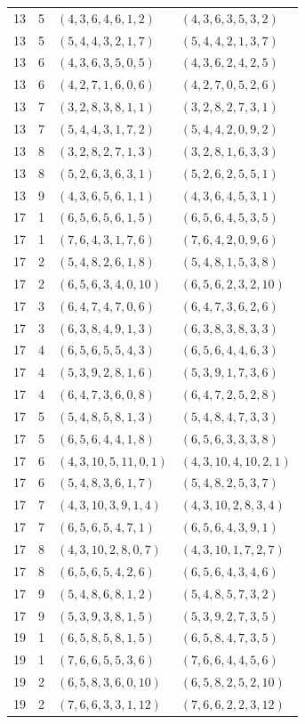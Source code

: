 \begin{longtable}{rrll}
13&5&$(4,3,6,4,6,1,2)$&$(4,3,6,3,5,3,2)$\\
13&5&$(5,4,4,3,2,1,7)$&$(5,4,4,2,1,3,7)$\\
13&6&$(4,3,6,3,5,0,5)$&$(4,3,6,2,4,2,5)$\\
13&6&$(4,2,7,1,6,0,6)$&$(4,2,7,0,5,2,6)$\\
13&7&$(3,2,8,3,8,1,1)$&$(3,2,8,2,7,3,1)$\\
13&7&$(5,4,4,3,1,7,2)$&$(5,4,4,2,0,9,2)$\\
13&8&$(3,2,8,2,7,1,3)$&$(3,2,8,1,6,3,3)$\\
13&8&$(5,2,6,3,6,3,1)$&$(5,2,6,2,5,5,1)$\\
13&9&$(4,3,6,5,6,1,1)$&$(4,3,6,4,5,3,1)$\\
17&1&$(6,5,6,5,6,1,5)$&$(6,5,6,4,5,3,5)$\\
17&1&$(7,6,4,3,1,7,6)$&$(7,6,4,2,0,9,6)$\\
17&2&$(5,4,8,2,6,1,8)$&$(5,4,8,1,5,3,8)$\\
17&2&$(6,5,6,3,4,0,10)$&$(6,5,6,2,3,2,10)$\\
17&3&$(6,4,7,4,7,0,6)$&$(6,4,7,3,6,2,6)$\\
17&3&$(6,3,8,4,9,1,3)$&$(6,3,8,3,8,3,3)$\\
17&4&$(6,5,6,5,5,4,3)$&$(6,5,6,4,4,6,3)$\\
17&4&$(5,3,9,2,8,1,6)$&$(5,3,9,1,7,3,6)$\\
17&4&$(6,4,7,3,6,0,8)$&$(6,4,7,2,5,2,8)$\\
17&5&$(5,4,8,5,8,1,3)$&$(5,4,8,4,7,3,3)$\\
17&5&$(6,5,6,4,4,1,8)$&$(6,5,6,3,3,3,8)$\\
17&6&$(4,3,10,5,11,0,1)$&$(4,3,10,4,10,2,1)$\\
17&6&$(5,4,8,3,6,1,7)$&$(5,4,8,2,5,3,7)$\\
17&7&$(4,3,10,3,9,1,4)$&$(4,3,10,2,8,3,4)$\\
17&7&$(6,5,6,5,4,7,1)$&$(6,5,6,4,3,9,1)$\\
17&8&$(4,3,10,2,8,0,7)$&$(4,3,10,1,7,2,7)$\\
17&8&$(6,5,6,5,4,2,6)$&$(6,5,6,4,3,4,6)$\\
17&9&$(5,4,8,6,8,1,2)$&$(5,4,8,5,7,3,2)$\\
17&9&$(5,3,9,3,8,1,5)$&$(5,3,9,2,7,3,5)$\\
19&1&$(6,5,8,5,8,1,5)$&$(6,5,8,4,7,3,5)$\\
19&1&$(7,6,6,5,5,3,6)$&$(7,6,6,4,4,5,6)$\\
19&2&$(6,5,8,3,6,0,10)$&$(6,5,8,2,5,2,10)$\\
19&2&$(7,6,6,3,3,1,12)$&$(7,6,6,2,2,3,12)$\\

\end{longtable}
